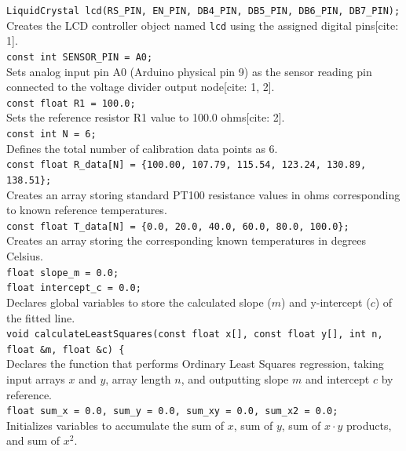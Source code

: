 \documentclass[12pt, a4paper]{article}
\begin{document}
	\noindent\texttt{LiquidCrystal lcd(RS\_PIN, EN\_PIN, DB4\_PIN, DB5\_PIN, DB6\_PIN, DB7\_PIN);}\\
	Creates the LCD controller object named \texttt{lcd} using the assigned digital pins[cite: 1].
	\\[6pt]
	
	\noindent\texttt{const int SENSOR\_PIN = A0;}\\
	Sets analog input pin A0 (Arduino physical pin 9) as the sensor reading pin connected to the voltage divider output node[cite: 1, 2].
	\\[6pt]
	
	\noindent\texttt{const float R1 = 100.0;}\\
	Sets the reference resistor R1 value to 100.0 ohms[cite: 2].
	\\[6pt]
	
	\noindent\texttt{const int N = 6;}\\
	Defines the total number of calibration data points as 6.
	\\[6pt]
	
	\noindent\texttt{const float R\_data[N] = \{100.00, 107.79, 115.54, 123.24, 130.89, 138.51\};}\\
	Creates an array storing standard PT100 resistance values in ohms corresponding to known reference temperatures.
	\\[6pt]
	
	\noindent\texttt{const float T\_data[N] = \{0.0, 20.0, 40.0, 60.0, 80.0, 100.0\};}\\
	Creates an array storing the corresponding known temperatures in degrees Celsius.
	\\[6pt]
	
	\noindent\texttt{float slope\_m = 0.0;}\\
	\texttt{float intercept\_c = 0.0;}\\
	Declares global variables to store the calculated slope ($m$) and y-intercept ($c$) of the fitted line.
	\\[6pt]
	
	\noindent\texttt{void calculateLeastSquares(const float x[], const float y[], int n, float \&m, float \&c) \{}\\
	Declares the function that performs Ordinary Least Squares regression, taking input arrays $x$ and $y$, array length $n$, and outputting slope $m$ and intercept $c$ by reference.
	\\[6pt]
	
	\noindent\texttt{float sum\_x = 0.0, sum\_y = 0.0, sum\_xy = 0.0, sum\_x2 = 0.0;}\\
	Initializes variables to accumulate the sum of $x$, sum of $y$, sum of $x \cdot y$ products, and sum of $x^2$.
	\\[6pt]
	
\end{document}
